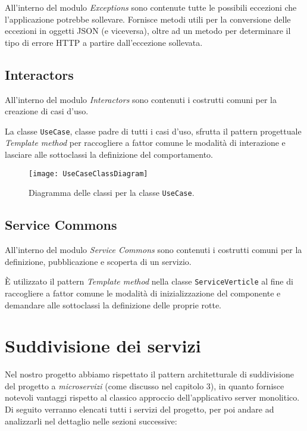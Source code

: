 All'interno del modulo \textit{Exceptions} sono contenute tutte le possibili eccezioni che l'applicazione potrebbe sollevare. Fornisce metodi utili per la conversione delle eccezioni in oggetti JSON (e viceversa), oltre ad un metodo per determinare il tipo di errore HTTP a partire dall'eccezione sollevata.

\subsection{Interactors}

All'interno del modulo \textit{Interactors} sono contenuti i costrutti comuni per la creazione di casi d'uso.

La classe \texttt{UseCase}, classe padre di tutti i casi d'uso, sfrutta il pattern progettuale \textit{Template method} per raccogliere a fattor comune le modalit\`a di interazione e lasciare alle sottoclassi la definizione del comportamento.

\begin{figure}[H]
  \centering
    \texttt{[image: UseCaseClassDiagram]}
  \caption{Diagramma delle classi per la classe \texttt{UseCase}.}
\end{figure}

\subsection{Service Commons}

All'interno del modulo \textit{Service Commons} sono contenuti i costrutti comuni per la definizione, pubblicazione e scoperta di un servizio.

\`E utilizzato il pattern \textit{Template method} nella classe \texttt{ServiceVerticle} al fine di raccogliere a fattor comune le modalit\`a di inizializzazione del componente e demandare alle sottoclassi la definizione delle proprie rotte.

\section{Suddivisione dei servizi}

Nel nostro progetto abbiamo rispettato il pattern architetturale di suddivisione del progetto a \textit{microservizi} (come discusso nel capitolo 3), in quanto fornisce notevoli vantaggi rispetto al classico approccio dell'applicativo server monolitico.
%
Di seguito verranno elencati tutti i servizi del progetto, per poi andare ad analizzarli nel dettaglio nelle sezioni successive:

